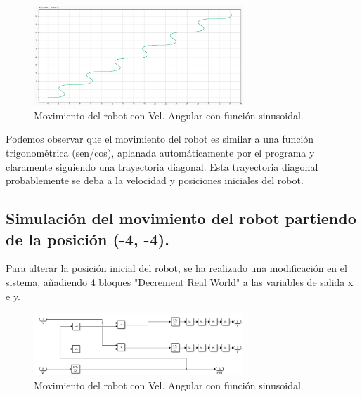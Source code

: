 \documentclass[a4paper, 12pt]{article}
\begin{document}
        \begin{figure}[htp!]
		\centering
		\includegraphics[width=0.7\textwidth]{figures/Movimiento_robot_sinusoidal.png}
		\caption{Movimiento del robot con Vel. Angular con función sinusoidal.}
	\end{figure}
        Podemos observar que el movimiento del robot es similar a una función trigonométrica (sen/cos), aplanada automáticamente por el programa y claramente siguiendo una trayectoria diagonal. Esta trayectoria diagonal probablemente se deba a la velocidad y posiciones iniciales del robot.

    \subsection{Simulación del movimiento del robot partiendo de la posición (-4, -4).}

    Para alterar la posición inicial del robot, se ha realizado una modificación en el sistema, añadiendo 4 bloques "Decrement Real World" a las variables de salida x e y.

    \begin{figure}[htp!]
	\centering
		\includegraphics[width=0.7\textwidth]{figures/SistemaPosicionCambiada.png}
		\caption{Movimiento del robot con Vel. Angular con función sinusoidal.}
	\end{figure}
\end{document}

